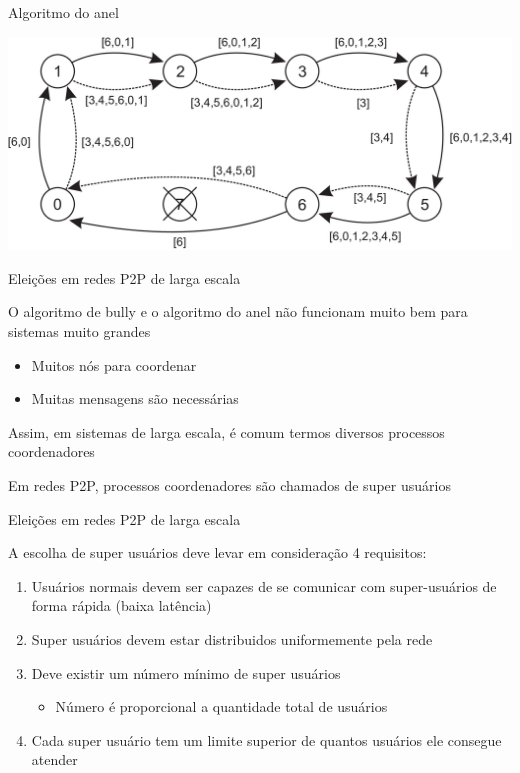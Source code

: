 \documentclass[compress]{beamer}
\begin{document}
\begin{frame}{Algoritmo do anel}

\centering \includegraphics[width=\textwidth]{images/ring.png}

\end{frame}


\begin{frame}{Eleições em redes P2P de larga escala}

O algoritmo de bully e o algoritmo do anel não funcionam muito bem para sistemas muito grandes
\begin{itemize}
    \item Muitos nós para coordenar
    \item Muitas mensagens são necessárias
\end{itemize}

\vspace{0.5cm}

Assim, em sistemas de larga escala, é comum termos diversos processos coordenadores

\vspace{0.5cm}

Em redes P2P, processos coordenadores são chamados de super usuários

\end{frame}


\begin{frame}{Eleições em redes P2P de larga escala}

A escolha de super usuários deve levar em consideração 4 requisitos:
\begin{enumerate}
    \item Usuários normais devem ser capazes de se comunicar com super-usuários de forma rápida (baixa latência)
    \item Super usuários devem estar distribuidos uniformemente pela rede
    \item Deve existir um número mínimo de super usuários
    \begin{itemize}
        \item Número é proporcional a quantidade total de usuários
    \end{itemize}
    \item Cada super usuário tem um limite superior de quantos usuários ele consegue atender
\end{enumerate}

\end{frame}
\end{document}

